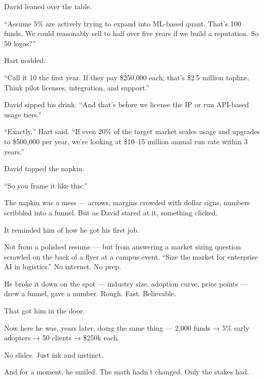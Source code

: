 David leaned over the table.

``Assume 5\% are actively trying to expand into ML-based quant. That’s 100 funds.  
We could reasonably sell to half over five years if we build a reputation. So 50 logos?''

Hart nodded.

``Call it 10 the first year. If they pay \$250{,}000 each, that’s \$2.5 million topline.  
Think pilot licenses, integration, and support.''

David sipped his drink. ``And that’s before we license the IP or run API-based usage tiers.''

``Exactly,'' Hart said. ``If even 20\% of the target market scales usage and upgrades to \$500{,}000 per year,  
we’re looking at \$10–15 million annual run rate within 3 years.''

David tapped the napkin.

``So you frame it like this:''

The napkin was a mess — arrows, margins crowded with dollar signs, numbers scribbled into a funnel. But as David 
stared at it, something clicked.

It reminded him of how he got his first job.

Not from a polished resume — but from answering a market sizing question scrawled on the back of a flyer at a campus event.
“Size the market for enterprise AI in logistics.” No internet. No prep.

He broke it down on the spot — industry size, adoption curve, price points — drew a funnel, gave a number.
Rough. Fast. Believable.

That got him in the door.

Now here he was, years later, doing the same thing —
2,000 funds → 5\% early adopters → 50 clients → \$250k each.

No slides. Just ink and instinct.

And for a moment, he smiled.
The math hadn’t changed.
Only the stakes had.

\medskip

